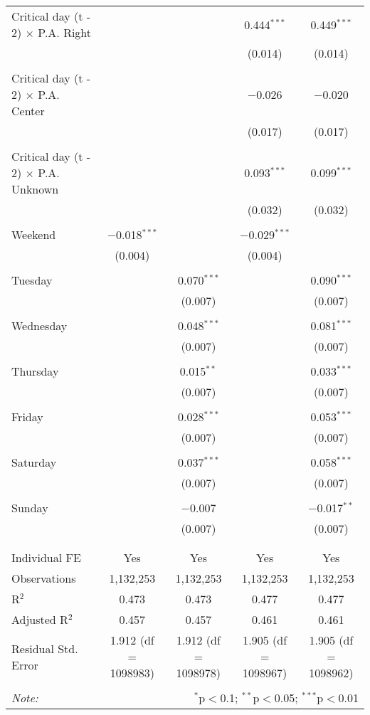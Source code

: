 \documentclass[
]{article}
\begin{document}
\begin{table}[!htbp]
{\begin{tabular}{@{\extracolsep{5pt}}lcccc}
 Critical day (t - 2) $\times$ P.A. Right &  &  & 0.444$^{***}$ & 0.449$^{***}$ \\ 
  &  &  & (0.014) & (0.014) \\ 
  & & & & \\ 
 Critical day (t - 2) $\times$ P.A. Center &  &  & $-$0.026 & $-$0.020 \\ 
  &  &  & (0.017) & (0.017) \\ 
  & & & & \\ 
 Critical day (t - 2) $\times$ P.A. Unknown &  &  & 0.093$^{***}$ & 0.099$^{***}$ \\ 
  &  &  & (0.032) & (0.032) \\ 
  & & & & \\ 
 Weekend & $-$0.018$^{***}$ &  & $-$0.029$^{***}$ &  \\ 
  & (0.004) &  & (0.004) &  \\ 
  & & & & \\ 
 Tuesday &  & 0.070$^{***}$ &  & 0.090$^{***}$ \\ 
  &  & (0.007) &  & (0.007) \\ 
  & & & & \\ 
 Wednesday &  & 0.048$^{***}$ &  & 0.081$^{***}$ \\ 
  &  & (0.007) &  & (0.007) \\ 
  & & & & \\ 
 Thursday &  & 0.015$^{**}$ &  & 0.033$^{***}$ \\ 
  &  & (0.007) &  & (0.007) \\ 
  & & & & \\ 
 Friday &  & 0.028$^{***}$ &  & 0.053$^{***}$ \\ 
  &  & (0.007) &  & (0.007) \\ 
  & & & & \\ 
 Saturday &  & 0.037$^{***}$ &  & 0.058$^{***}$ \\ 
  &  & (0.007) &  & (0.007) \\ 
  & & & & \\ 
 Sunday &  & $-$0.007 &  & $-$0.017$^{**}$ \\ 
  &  & (0.007) &  & (0.007) \\ 
  & & & & \\ 
\hline \\[-1.8ex] 
Individual FE & Yes & Yes & Yes & Yes \\ 
Observations & 1,132,253 & 1,132,253 & 1,132,253 & 1,132,253 \\ 
R$^{2}$ & 0.473 & 0.473 & 0.477 & 0.477 \\ 
Adjusted R$^{2}$ & 0.457 & 0.457 & 0.461 & 0.461 \\ 
Residual Std. Error & 1.912 (df = 1098983) & 1.912 (df = 1098978) & 1.905 (df = 1098967) & 1.905 (df = 1098962) \\ 
\hline 
\hline \\[-1.8ex] 
\textit{Note:}  & \multicolumn{4}{r}{$^{*}$p$<$0.1; $^{**}$p$<$0.05; $^{***}$p$<$0.01} \\ 
\end{tabular}
} 
\end{table} 
\newpage
\end{document}
